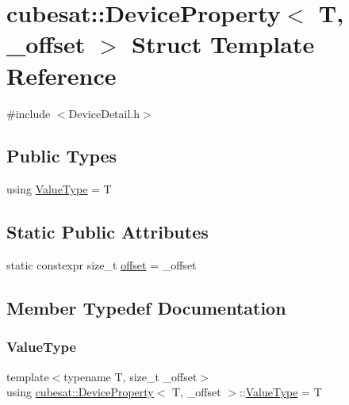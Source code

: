 \hypertarget{structcubesat_1_1DeviceProperty}{}\section{cubesat\+:\+:Device\+Property$<$ T, \+\_\+offset $>$ Struct Template Reference}
\label{structcubesat_1_1DeviceProperty}


{\ttfamily \#include $<$Device\+Detail.\+h$>$}

\subsection*{Public Types}
\begin{DoxyCompactItemize}
\item 
using \hyperlink{structcubesat_1_1DeviceProperty_adecbcb5333f78f150ddaf2d3b3828418}{Value\+Type} = T
\end{DoxyCompactItemize}
\subsection*{Static Public Attributes}
\begin{DoxyCompactItemize}
\item 
static constexpr size\+\_\+t \hyperlink{structcubesat_1_1DeviceProperty_a7933ea00a94fae2ada82baf975d8e557}{offset} = \+\_\+offset
\end{DoxyCompactItemize}


\subsection{Member Typedef Documentation}
\mbox{\label{structcubesat_1_1DeviceProperty_adecbcb5333f78f150ddaf2d3b3828418}} 
\subsubsection{\texorpdfstring{Value\+Type}{ValueType}}
{\footnotesize\ttfamily template$<$typename T, size\+\_\+t \+\_\+offset$>$ \\
using \hyperlink{structcubesat_1_1DeviceProperty}{cubesat\+::\+Device\+Property}$<$ T, \+\_\+offset $>$\+::\hyperlink{structcubesat_1_1DeviceProperty_adecbcb5333f78f150ddaf2d3b3828418}{Value\+Type} =  T}



